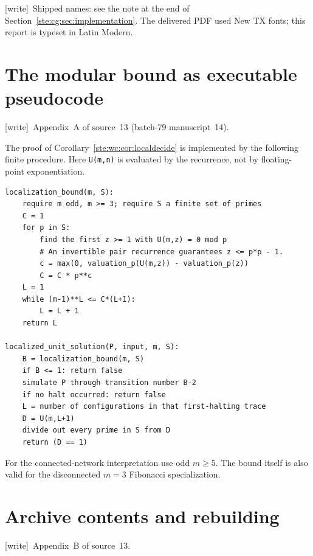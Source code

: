 \documentclass[11pt,letterpaper]{article}
\theoremstyle{definition}
\theoremstyle{remark}
\newcommand{\wtag}{\textup{[write]}}
\begin{document}
\wtag\ Shipped names: see the note at the end of Section~\ref{ste:cg:sec:implementation}. The delivered PDF used New TX fonts; this report is typeset in Latin Modern.

\section{The modular bound as executable pseudocode}
\label{ste:wc:app:algorithm}
\noindent\wtag\ Appendix~A of source~13 (batch-79 manuscript~14).

The proof of Corollary~\ref{ste:wc:cor:localdecide} is implemented by the following finite
procedure. Here \texttt{U(m,n)} is evaluated by the recurrence, not by
floating-point exponentiation.
\begin{lstlisting}
localization_bound(m, S):
    require m odd, m >= 3; require S a finite set of primes
    C = 1
    for p in S:
        find the first z >= 1 with U(m,z) = 0 mod p
        # An invertible pair recurrence guarantees z <= p*p - 1.
        c = max(0, valuation_p(U(m,z)) - valuation_p(z))
        C = C * p**c
    L = 1
    while (m-1)**L <= C*(L+1):
        L = L + 1
    return L

localized_unit_solution(P, input, m, S):
    B = localization_bound(m, S)
    if B <= 1: return false
    simulate P through transition number B-2
    if no halt occurred: return false
    L = number of configurations in that first-halting trace
    D = U(m,L+1)
    divide out every prime in S from D
    return (D == 1)
\end{lstlisting}
For the connected-network interpretation use odd $m\geq5$. The bound
itself is also valid for the disconnected $m=3$ Fibonacci specialization.

\section{Archive contents and rebuilding}\label{ste:wc:app:archive}

\noindent\wtag\ Appendix~B of source~13.
\end{document}
